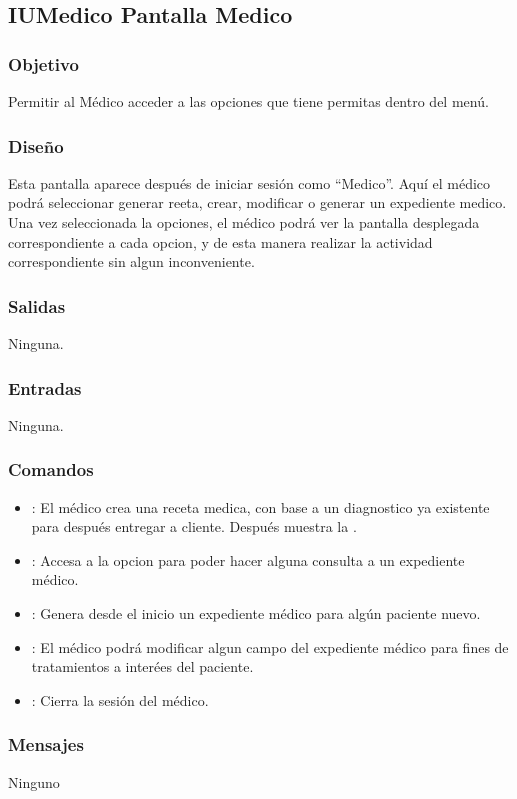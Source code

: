 \subsection{IUMedico Pantalla Medico}

\subsubsection{Objetivo}
	Permitir al M\'edico acceder a las opciones que tiene permitas dentro del men\'u.

\subsubsection{Diseño}
	Esta pantalla aparece despu\'es de iniciar sesi\'on como "`Medico"'. Aqu\'i el m\'edico podr\'a seleccionar generar reeta, crear, modificar o generar un expediente medico. Una vez seleccionada la opciones, el m\'edico podr\'a ver la pantalla desplegada correspondiente a cada opcion, y de esta manera realizar la actividad correspondiente sin algun inconveniente.


\subsubsection{Salidas}

	Ninguna.

\subsubsection{Entradas}
Ninguna.

\subsubsection{Comandos}
\begin{itemize}
		\item {}: El m\'edico crea una receta medica, con base a un diagnostico ya existente para despu\'es entregar a cliente. Despu\'es muestra la \label{IUConfirmar}.
		\item {}: Accesa a la opcion para poder hacer alguna consulta a un expediente m\'edico.
		\item {}: Genera desde el inicio un expediente m\'edico para alg\'un paciente nuevo.
		\item {}: El m\'edico podr\'a modificar algun campo del expediente m\'edico para fines de tratamientos a inter\'ees del paciente.
		\item {}: Cierra la sesi\'on del m\'edico.
\end{itemize}

\subsubsection{Mensajes}
	\begin{Citemize}
	Ninguno
	\end{Citemize}